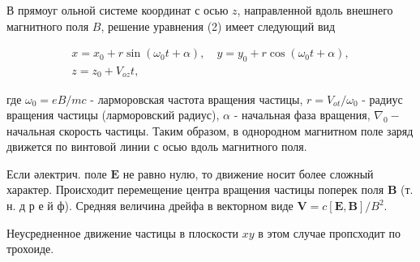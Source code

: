 \documentclass[10pt]{article}
\begin{document}
В прямоуг ольной системе координат с осью $z$, направленной вдоль внешнего магнитного поля $B$, решение уравнения (2) имеет следующий вид



\[

\begin{gathered}

x=x_{0}+r \sin \left(\omega_{0} t+\alpha\right), \quad y=y_{0}+r \cos \left(\omega_{0} t+\alpha\right), \\

z=z_{0}+V_{o z} t,

\end{gathered}

\]



где $\omega_{0}=e B / m c$ - ларморовская частота вращения частицы, $r=V_{o t} / \omega_{0}$ - радиус вращения частицы (ларморовский радиус), $\alpha$ - начальная фаза вращения, $\nabla_{0}-$ начальная скорость частицы. Таким образом, в однородном магнитном поле заряд движется по винтовой линии с осью вдоль магнитного поля.



Если әлектрич. поле $\boldsymbol{E}$ не равно нулю, то движение носит более сложный характер. Происходит перемещение центра вращения частицы поперек поля $\boldsymbol{B}$ (т. н. д р е й ф). Средняя величина дрейфа в векторном виде $\boldsymbol{V}=c[\boldsymbol{E}, \boldsymbol{B}] / B^{2}$.



Неусредненное движение частицы в плоскости $x y$ в этом случае пропсходит по трохоиде.
\end{document}
